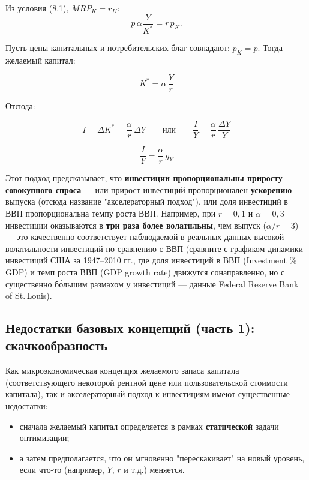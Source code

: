 \documentclass[10pt,a4paper]{article}
\begin{document}
Из условия (8.1), $MRP_K=r_K$:
$$p\,\alpha\frac{Y}{K^{*}} = r\,p_K.$$

Пусть цены капитальных и потребительских благ совпадают: $p_K=p$. Тогда желаемый капитал:
\begin{formulabox}
\begin{equation}
K^{*} = \alpha\,\frac{Y}{r} \tag{8.3}
\end{equation}
\end{formulabox}

Отсюда:
\begin{formulabox}
\begin{equation}
I = \Delta K^{*} = \frac{\alpha}{r}\,\Delta Y \qquad\text{или}\qquad \frac{I}{Y} = \frac{\alpha}{r}\,\frac{\Delta Y}{Y} \tag{8.4}
\end{equation}
\end{formulabox}
\begin{formulabox}
\begin{equation}
\frac{I}{Y} = \frac{\alpha}{r}\,g_Y \tag{8.5}
\end{equation}
\end{formulabox}

\begin{intuition}
Этот подход предсказывает, что \textbf{инвестиции пропорциональны приросту совокупного спроса} — или прирост инвестиций пропорционален \textbf{ускорению} выпуска (отсюда название "акселераторный подход"), или доля инвестиций в ВВП пропорциональна темпу роста ВВП. Например, при $r=0{,}1$ и $\alpha=0{,}3$ инвестиции оказываются в \textbf{три раза более волатильны}, чем выпуск ($\alpha/r=3$) — это качественно соответствует наблюдаемой в реальных данных высокой волатильности инвестиций по сравнению с ВВП (сравните с графиком динамики инвестиций США за 1947--2010 гг., где доля инвестиций в ВВП (Investment \% GDP) и темп роста ВВП (GDP growth rate) движутся сонаправленно, но с существенно бо́льшим размахом у инвестиций — данные Federal Reserve Bank of St.\,Louis).
\end{intuition}

\subsection{Недостатки базовых концепций (часть 1): скачкообразность}

Как микроэкономическая концепция желаемого запаса капитала (соответствующего некоторой рентной цене или пользовательской стоимости капитала), так и акселераторный подход к инвестициям имеют существенные недостатки:
\begin{itemize}[leftmargin=1.3em]
\item сначала желаемый капитал определяется в рамках \textbf{статической} задачи оптимизации;
\item а затем предполагается, что он мгновенно "перескакивает" на новый уровень, если что-то (например, $Y$, $r$ и т.д.) меняется.
\end{itemize}
\end{document}
